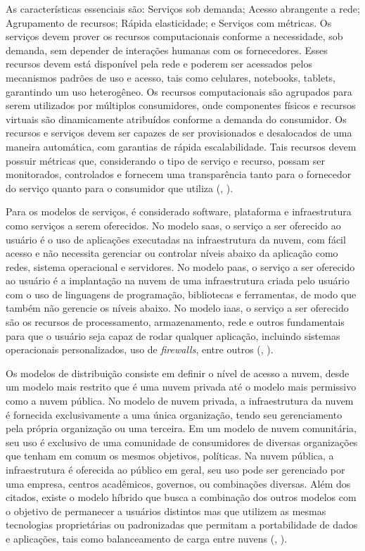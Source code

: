 \documentclass[]{politex}
\begin{document}
As características essenciais são: Serviços sob demanda; Acesso abrangente a rede; Agrupamento de recursos; Rápida elasticidade; e Serviços com métricas. Os serviços devem prover os recursos computacionais conforme a necessidade, sob demanda, sem depender de interações humanas com os fornecedores. Esses recursos devem está disponível pela rede e poderem ser acessados pelos mecanismos padrões de uso e acesso, tais como celulares, notebooks, tablets, garantindo um uso heterogêneo. Os recursos computacionais são agrupados para serem utilizados por múltiplos consumidores, onde componentes físicos e recursos virtuais são dinamicamente atribuídos conforme a demanda do consumidor. Os recursos e serviços devem ser capazes de ser provisionados e desalocados de uma maneira automática, com garantias de rápida escalabilidade. Tais recursos devem possuir métricas que, considerando o tipo de serviço e recurso, possam ser monitorados, controlados e  fornecem uma transparência tanto para o fornecedor do serviço quanto para o consumidor que utiliza (, \citeyear{nist}).

Para os modelos de serviços, é considerado software, plataforma e infraestrutura como serviços a serem oferecidos. No modelo \acrfull{saas}, o serviço a ser oferecido ao usuário é o uso de aplicações executadas na infraestrutura da nuvem, com fácil acesso e não necessita gerenciar ou controlar níveis abaixo da aplicação como redes, sistema operacional e servidores. No modelo \acrfull{paas}, o serviço a ser oferecido ao usuário é a implantação na nuvem de uma infraestrutura criada pelo usuário com o uso de linguagens de programação, bibliotecas e ferramentas, de modo que também não gerencie os níveis abaixo. No modelo \acrfull{iaas}, o serviço a ser oferecido são os recursos de processamento, armazenamento, rede e outros fundamentais para que o usuário seja capaz de rodar qualquer aplicação, incluindo sistemas operacionais personalizados, uso de \textit{firewalls}, entre outros (, \citeyear{nist}).

Os modelos de distribuição consiste em definir o nível de acesso a nuvem, desde um modelo mais restrito que é uma nuvem privada até o modelo mais permissivo como a nuvem pública. No modelo de nuvem privada, a infraestrutura da nuvem é fornecida exclusivamente a uma única organização, tendo seu gerenciamento pela própria organização ou uma terceira. Em um modelo de nuvem comunitária, seu uso é exclusivo de uma comunidade de consumidores de diversas organizações que tenham em comum os mesmos objetivos, políticas. Na nuvem pública, a infraestrutura é oferecida ao público em geral, seu uso pode ser gerenciado por uma empresa, centros acadêmicos, governos, ou combinações diversas. Além dos citados, existe o modelo híbrido que busca a combinação dos outros modelos com o objetivo de permanecer a usuários distintos mas que utilizem as mesmas tecnologias proprietárias ou padronizadas que permitam a portabilidade de dados e aplicações, tais como balanceamento de carga entre nuvens (, \citeyear{nist}).
\end{document}
